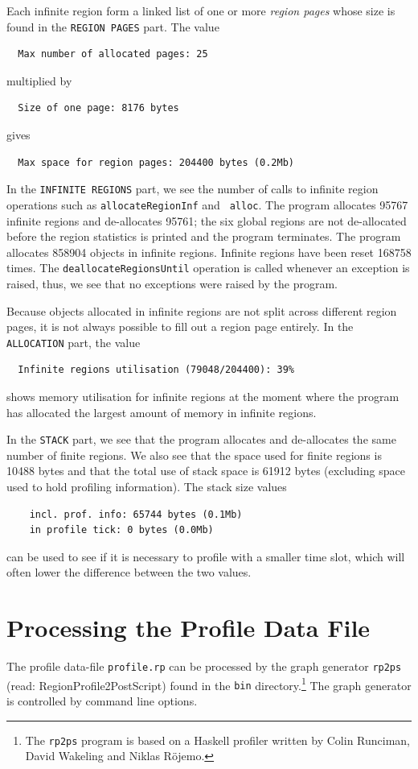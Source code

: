 \documentclass[12pt]{book}
\begin{document}
Each infinite region form a linked list of one or more
%
{\em region pages\/} whose size is found in the {\tt REGION PAGES}
part. The value
\begin{verbatim}
  Max number of allocated pages: 25
\end{verbatim}
multiplied by
\begin{verbatim}
  Size of one page: 8176 bytes
\end{verbatim}
gives
\begin{verbatim}
  Max space for region pages: 204400 bytes (0.2Mb)
\end{verbatim}

In the {\tt INFINITE REGIONS} part, we see the number of calls to
infinite region operations such as {\tt allocateRegionInf} and {\tt
  alloc}. The program allocates 95767 infinite regions and
de-allocates 95761; the six global regions are not de-allocated
before the region statistics is printed and the program terminates.
The program allocates 858904 objects in infinite regions. Infinite
regions have been reset 168758 times. The {\tt deallocateRegionsUntil}
operation is called whenever an exception is raised, thus, we see that
no exceptions were raised by the program.

Because objects allocated in infinite regions are not split across
different region pages, it is not always possible to
fill out a region page entirely. In the {\tt ALLOCATION} part, the value
\begin{verbatim}
  Infinite regions utilisation (79048/204400): 39%
\end{verbatim}
shows memory utilisation for infinite regions at the moment where the
program has allocated the largest amount of memory in infinite
regions.

In the {\tt STACK} part, we see that the program allocates and
de-allocates the same number of finite regions. We also see that the
space used for finite regions is 10488 bytes and that the total use of
stack space is 61912 bytes (excluding space used to hold profiling
information). The stack size values
\begin{verbatim}
    incl. prof. info: 65744 bytes (0.1Mb)
    in profile tick: 0 bytes (0.0Mb)
\end{verbatim}
can be used to see if it is necessary to profile with a smaller time
slot, which will often lower the difference between the two values.


\section{Processing the Profile Data File}
The profile data-file {\tt profile.rp} can be processed by the
%
graph generator {\tt rp2ps} (read: RegionProfile2PostScript) found in
the {\tt bin} directory.\footnote{The {\tt rp2ps} program is based on
  a Haskell profiler written by Colin Runciman, David Wakeling and Niklas
  R\"{o}jemo.} The graph generator is controlled by command line
options.
\end{document}
